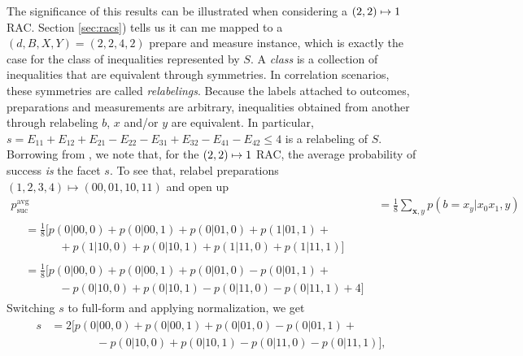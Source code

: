             The significance of this results can be illustrated when considering a $\left( 2, 2 \right) \mapsto 1$ RAC. Section \ref{sec:racs}) tells us it can me mapped to a $(d,B,X,Y) = (2,2,4,2)$ prepare and measure instance, which is exactly the case for the class of inequalities represented by $S$. A \emph{class} is a collection of inequalities that are equivalent through symmetries. In correlation scenarios, these symmetries are called \emph{relabelings}. Because the labels attached to outcomes, preparations and measurements are arbitrary, inequalities obtained from another through relabeling $b$, $x$ and/or $y$ are equivalent. In particular, $s = E_{11} + E_{12} + E_{21} - E_{22} - E_{31} + E_{32} - E_{41} - E_{42} \leq 4$ is a relabeling of $S$. Borrowing from \cite{pawlowski_pamqkd_2011}, we note that, for the $\left( 2, 2 \right) \mapsto 1$ RAC, the average probability of success \emph{is} the facet $s$. To see that, relabel preparations $\left( 1, 2, 3, 4 \right) \mapsto \left(00, 01, 10, 11\right)$ and open up
            \begin{align*}
                        p_{\text{suc}}^{\text{avg}} &= \frac{1}{8} \sum_{\mathbf{x}, y} p(b = x_y \vert x_0 x_1, y) \\
                        \begin{split}
                            &= \frac{1}{8} \big[ p(0 \vert 00, 0) + p(0 \vert 00, 1) + p(0 \vert 01, 0) + p(1 \vert 01, 1) + \\
                            &\quad\qquad + p(1 \vert 10, 0) + p(0 \vert 10, 1) + p(1 \vert 11, 0) + p(1 \vert 11, 1) \big]
                        \end{split}
                        \\
                        \begin{split}
                            &= \frac{1}{8} \big[ p(0 \vert 00, 0) + p(0 \vert 00, 1) + p(0 \vert 01, 0) - p(0 \vert 01, 1) + \\
                            &\quad\qquad - p(0 \vert 10, 0) + p(0 \vert 10, 1) - p(0 \vert 11, 0) - p(0 \vert 11, 1) + 4 \big]
                        \end{split}
            \end{align*}
            Switching $s$ to full-form and applying normalization, we get
            \begin{align*}
            \begin{split}
                s &= 2 \big[ p(0 \vert 00, 0) + p(0 \vert 00, 1) + p(0 \vert 01, 0) - p(0 \vert 01, 1) + \\
                &\qquad\qquad - p(0 \vert 10, 0) + p(0 \vert 10, 1) - p(0 \vert 11, 0) - p(0 \vert 11, 1) \big] ,
            \end{split}
            \end{align*}
